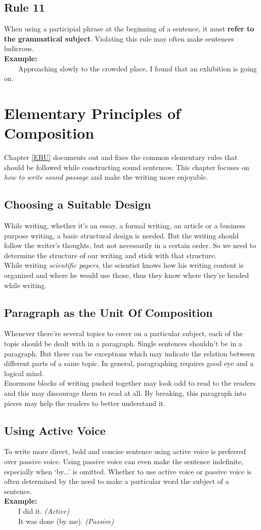 \documentclass[12pt]{report}
\newcommand{\xmpl}{\textbf{Example:}\\} %
\newcommand{\indnt}{\ \ \ \ } %
\begin{document}
\section{Rule 11}\label{rl11}
When using a participial phrase at the beginning of a sentence, it must \textbf{refer to the grammatical subject}. Violating this rule may often make sentences ludicrous.\\
\xmpl
\indnt Approaching slowly to the crowded place, I found that an exhibition is going on.




\chapter{Elementary Principles of Composition}
Chapter \ref{ERU} documents out and fixes the common elementary rules that should be followed while constructing sound sentences. This chapter focuses on \emph{how to write sound passage} and make the writing more enjoyable.

\section{Choosing a Suitable Design} \label{CSD}
While writing, whether it's an essay, a formal writing, an article or a business purpose writing, a basic structural design is needed. But the writing should follow the writer's thoughts, but not necessarily in a certain order. So we need to determine the structure of our writing and stick with that structure.\\
While writing \emph{scientific papers}, the scientist knows how his writing content is organized and where he would use those, thus they know where they're headed while writing.
\section{Paragraph as the Unit Of Composition}
Whenever there're several topics to cover on a particular subject, each of the topic should be dealt with in a paragraph. Single sentences shouldn't be in a paragraph. But there can be exceptions which may indicate the relation between different parts of a same topic. In general, paragraphing requires good eye and a logical mind.\\
Enormous blocks of writing pushed together may look odd to read to the readers and this may discourage them to read at all. By breaking, this paragraph into pieces may help the readers to better understand it.
\section{Using Active Voice}
To write more direct, bold and concise sentence using active voice is preferred over passive voice. Using passive voice can even make the sentence indefinite, especially when `by...' is omitted. Whether to use active voice or passive voice is often determined by the need to make a particular word the subject of a sentence.\\
\xmpl
\indnt I did it. \emph{(Active)}\\
\indnt It was done (by me). \emph{(Passive)}
\end{document}
